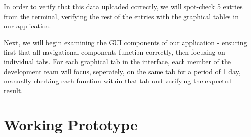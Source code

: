 \documentclass[11pt]{article}
\begin{document}
In order to verify that this data uploaded correctly, we will spot-check 5 entries from the terminal, verifying the rest of the entries with the graphical tables in our application.

Next, we will begin examining the GUI components of our application - ensuring first that all navigational components function correctly, then focusing on individual tabs.
For each graphical tab in the interface, each member of the development team will focus, seperately, on the same tab for a period of 1 day, manually checking each function within that tab and verifying the expected result.

\section*{Working Prototype}
\label{sec:org9d77f55}
\end{document}
